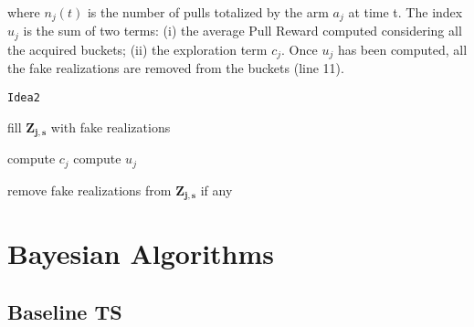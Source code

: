 where $n_j(t)$ is the number of pulls totalized by the arm $a_j$ at time t. The index $u_j$ is the sum of two terms: (i) the average Pull Reward computed considering all the acquired buckets; (ii) the exploration term  $c_j$. Once $u_j$ has been computed, all the fake realizations are removed from the buckets (line 11).

\begin{algorithm}[H]
	\caption{\texttt{Idea2}}
	\begin{scriptsize}
		\begin{algorithmic}[1]
			
			
			
			
			\State fill $\boldsymbol{Z_{j,s}}$ with fake realizations
			\EndIf
			
			\EndFor		
			\State compute $c_j$\;
			\State compute $u_j$\;
			
			\State remove fake realizations from $\boldsymbol{Z_{j,s}}$ if any			
			\EndFor
			
	
							
			\EndFor
			
					
			\EndFunction
			
		\end{algorithmic}
	\end{scriptsize}
	\label{alg:Idea2}
\end{algorithm}




\section{Bayesian Algorithms}

\subsection{Baseline TS}

